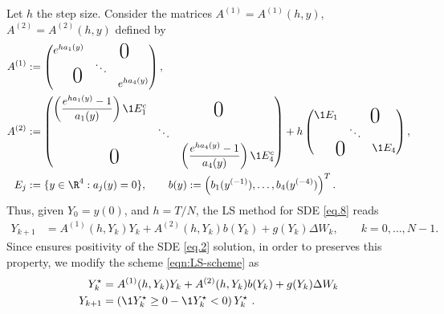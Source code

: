 Let $h$ the step size. Consider the matrices 
$
	A^{(1)}= A^{(1)}(h,y)
$,
$
A^{(2)}= A^{(2)}(h,y)
$
defined by
\begin{align*}
	A^{(1)}&:=
		\begin{pmatrix}
			e^{ha_1(y)} & 
			\multicolumn{2}{c}{
				\text{\kern0.5em\smash{\raisebox{-1ex}{\huge 0}}}
			} \\
			&\ddots\\
			\multicolumn{2}{c}{
				\text{\kern-0.5em\smash{\raisebox{0.95ex}{\huge 0}}}} 
			& e^{ha_4(y)}
		\end{pmatrix}, \notag
		\\
%
	A^{(2)}&:=
		\begin{pmatrix}
			\left(
				\displaystyle
				\frac{e^{ha_1(y)} - 1}{a_1(y)}
			\right)\1{E_1^c}
			& 
			\multicolumn{2}{c}{\text{\kern0.5em\smash{\raisebox{-1ex}{\huge 0}}}}\\
			& \ddots&\\
				\multicolumn{2}{c}{\text{\kern0.5em\smash{\raisebox{-1ex}{\huge 0}}}}&
			\left(
				\displaystyle
				\frac{e^{h a_4(y)} - 1}{a_4(y)}
			\right)\1{E_4^c}
		\end{pmatrix}
		+h
		\begin{pmatrix}
			\1{E_1} 
			&
			\multicolumn{2}{c}{\text{\kern0.5em\smash{\raisebox{-1ex}{\huge 0}}}}\\
			&
			\ddots 
			&\\
			\multicolumn{2}{c}{\text{\kern0.5em\smash{\raisebox{-1ex}{\huge 0}}}} 
			&\1{E_4}
		\end{pmatrix},\\
		E_j&:=\{y \in \R^4: a_j(y)=0\} , \qquad 
		b(y):= 
			\left(
				b_1(y^{(-1)}), \dots , b_4(y^{(-4)})
			\right)^T.
		\notag
\end{align*}
Thus, given $Y_0=y(0)$, and $h = T/N$, the LS method for 
SDE \eqref{eq.8} reads
\begin{equation}
	\begin{aligned}\label{eqn:LS-scheme}
		Y_{k+1} &= 
			A^{(1)}(h,Y_k)Y_k
			+ A^{(2)}(h,Y_k) b(Y_k) + g(Y_k) \Delta W_k
						,\qquad k=0,\dots, N-1.
	\end{aligned}
\end{equation}
Since  ensures positivity of the SDE \eqref{eq.2} solution,
in order to preserves this property, we modify the  
scheme \eqref{eqn:LS-scheme} as
\begin{equation}
	\begin{aligned}
		Y_k^{\star} &= 
				A^{(1)}(h,Y_k)Y_k
				+ A^{(2)}(h,Y_k)b(Y_k) + g(Y_k) \Delta W_k \\
		Y_{k+1} &=
			\left(
				\1{ Y_k^{\star}\geq 0} 
				-
				\1{ Y_k^{\star} < 0}
			\right)Y_{k}^{\star} ~.
	\end{aligned}
\end{equation}

